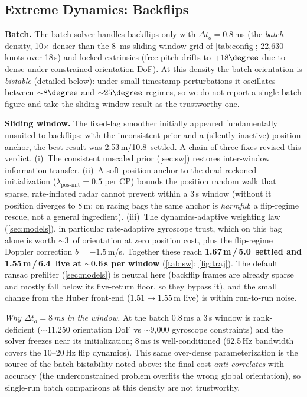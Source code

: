 \subsection{Extreme Dynamics: Backflips}
\label{sec:backflips}

\textbf{Batch.}
The batch solver handles backflips only with $\Delta t_o {=} 0.8$\,ms
(the \emph{batch} density, 10$\times$ denser than the \SI{8}{\milli\second}
sliding-window grid of \autoref{tab:config}; 22{,}630 knots over 18\,s) and
locked extrinsics (free pitch drifts to $+18\degree$ due to dense
under-constrained orientation DoF).  At this density the batch
orientation is \emph{bistable} (detailed below): under small
timestamp perturbations it oscillates between ${\sim}8\degree$ and
${\sim}25\degree$ regimes, so we do not report a single batch figure and
take the sliding-window result as the trustworthy one.

\textbf{Sliding window.}
The fixed-lag smoother initially appeared fundamentally unsuited to
backflips: with the inconsistent prior and a (silently inactive)
position anchor, the best result was 2.53\,m/10.8\degree\ settled.
A chain of three fixes revised this verdict.
(i)~The consistent unscaled prior (\autoref{sec:sw}) restores
inter-window information transfer.
(ii)~A soft position anchor to the dead-reckoned initialization
($\lambda_{\mathrm{pos\text{-}init}}{=}0.5$ per CP) bounds the
position random walk that sparse, rate-inflated radar cannot prevent
within a 3\,s window (without it position diverges to 8\,m; on racing
bags the same anchor is \emph{harmful}: a flip-regime rescue,
not a general ingredient).
(iii)~The dynamics-adaptive weighting law (\autoref{sec:models}),
in particular rate-adaptive gyroscope trust, which on this bag alone
is worth $\sim$3\degree\ of orientation at zero position cost,
plus the flip-regime Doppler correction $b{=}{-}1.5$\,m/s.
Together these reach \textbf{1.67\,m\,/\,5.0\degree\ settled and
1.55\,m\,/\,6.4\degree\ live at $\sim$0.6\,s per window}
(\autoref{tab:sw}; \autoref{fig:traj}).  The default \ac{ransac}
prefilter (\autoref{sec:models})
is neutral here (backflip frames are already sparse and mostly fall
below its five-return floor, so they bypass it), and the small change
from the Huber front-end ($1.51\to1.55$\,m live) is within run-to-run
noise.

\emph{Why $\Delta t_o{=}8$\,ms in the window.}
At the batch $0.8$\,ms a 3\,s window is rank-deficient
($\sim$11{,}250 orientation DoF vs $\sim$9{,}000 gyroscope constraints) and
the solver freezes near its initialization; 8\,ms is well-conditioned
(62.5\,Hz bandwidth covers the 10--20\,Hz flip dynamics).
This same over-dense parameterization is the source of the batch bistability noted
above: the final cost \emph{anti-correlates} with accuracy (the
underconstrained problem overfits the wrong global orientation), so
single-run batch comparisons at this density are not trustworthy.

